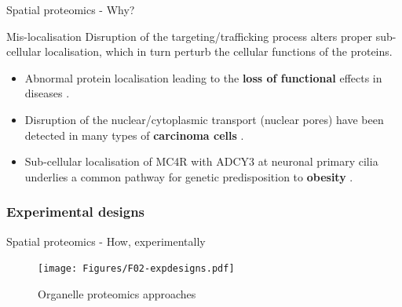 \begin{frame}{Spatial proteomics - Why?}
  \begin{block}{Mis-localisation}
    Disruption of the targeting/trafficking process alters proper
    sub-cellular localisation, which in turn perturb the cellular
    functions of the proteins.
    \begin{itemize}
    \item Abnormal protein localisation leading to the \textbf{loss of
        functional} effects in diseases \citep{Laurila2009}.
    \item Disruption of the nuclear/cytoplasmic transport (nuclear
      pores) have been detected in many types of \textbf{carcinoma
        cells} \citep{Kau2004}.
    \item Sub-cellular localisation of MC4R with ADCY3 at neuronal
      primary cilia underlies a common pathway for genetic
      predisposition to \textbf{obesity} \citep{Siljee:2018}.
    \end{itemize}
  \end{block}

\end{frame}


\subsubsection*{Experimental designs}
\label{sec:expdesign}

\begin{frame}{Spatial proteomics - How, experimentally}
  \begin{figure}
    \texttt{[image: Figures/F02-expdesigns.pdf]}
    \caption{Organelle proteomics approaches \citep{Gatto:2010}}
  \end{figure}
\end{frame}



